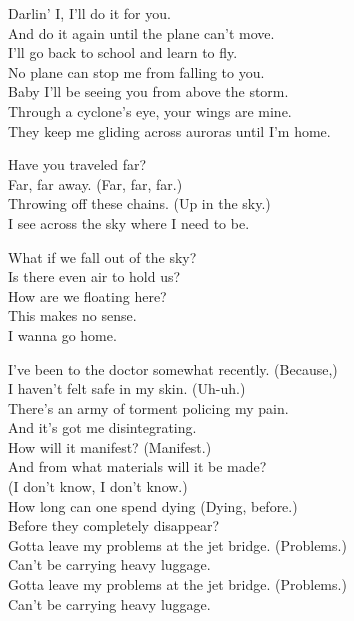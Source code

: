 Darlin' I, I'll do it for you. \\
And do it again until the plane can't move. \\
I'll go back to school and learn to fly. \\
No plane can stop me from falling to you. \\
Baby I'll be seeing you from above the storm. \\
Through a cyclone's eye, your wings are mine. \\
They keep me gliding across auroras until I'm home. \\


Have you traveled far? \\
Far, far away. (Far, far, far.) \\
Throwing off these chains. (Up in the sky.) \\
I see across the sky where I need to be. \\


What if we fall out of the sky? \\
Is there even air to hold us? \\
How are we floating here? \\
This makes no sense. \\
I wanna go home. \\




I've been to the doctor somewhat recently. (Because,) \\
I haven't felt safe in my skin. (Uh-uh.) \\
There's an army of torment policing my pain. \\
And it's got me disintegrating. \\

How will it manifest? (Manifest.) \\
And from what materials will it be made? \\
(I don't know, I don't know.) \\
How long can one spend dying (Dying, before.) \\
Before they completely disappear? \\

Gotta leave my problems at the jet bridge. (Problems.) \\
Can't be carrying heavy luggage. \\
Gotta leave my problems at the jet bridge. (Problems.) \\
Can't be carrying heavy luggage. \\

